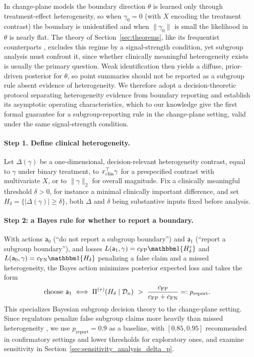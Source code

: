 \documentclass[11pt]{article}
\theoremstyle{definition}
\theoremstyle{plain}
\begin{document}
In change-plane models the boundary direction $\theta$ is learned only through treatment-effect heterogeneity, so when $\gamma_0=0$ (with $X$ encoding the treatment contrast) the boundary is unidentified and when $\|\gamma_0\|$ is small the likelihood in $\theta$ is nearly flat. The theory of Section~\ref{sec:theorems}, like its frequentist counterparts \citep[e.g.,][]{Fan2017,Kang2025}, excludes this regime by a signal-strength condition, yet subgroup analysis must confront it, since whether clinically meaningful heterogeneity exists is usually the primary question. Weak identification then yields a diffuse, prior-driven posterior for $\theta$, so point summaries should not be reported as a subgroup rule absent evidence of heterogeneity. We therefore adopt a decision-theoretic protocol separating heterogeneity evidence from boundary reporting and establish its asymptotic operating characteristics, which to our knowledge give the first formal guarantee for a subgroup-reporting rule in the change-plane setting, valid under the same signal-strength condition.

\paragraph{Step 1. Define clinical heterogeneity.}
Let $\Delta(\gamma)$ be a one-dimensional, decision-relevant heterogeneity contrast, equal to $\gamma$ under binary treatment, to $x_{\rm clin}^\top\gamma$ for a prespecified contrast with multivariate $X$, or to $\|\gamma\|_2$ for overall magnitude. Fix a clinically meaningful threshold $\delta>0$, for instance a minimal clinically important difference, and set $H_\delta=\{|\Delta(\gamma)|\ge\delta\}$, both $\Delta$ and $\delta$ being substantive inputs fixed before analysis.

\paragraph{Step 2: a Bayes rule for whether to report a boundary.}
With actions $\mathsf{a}_0$ (``do not report a subgroup boundary'') and $\mathsf{a}_1$ (``report a subgroup boundary''), and losses $L(\mathsf{a}_1,\gamma)=c_{\rm FP}\mathbbm 1\{H_\delta^c\}$ and $L(\mathsf{a}_0,\gamma)=c_{\rm FN}\mathbbm 1\{H_\delta\}$ penalizing a false claim and a missed heterogeneity, the Bayes action minimizes posterior expected loss and takes the form
\begin{equation}
    \text{choose }\mathsf{a}_1 \iff
\Pi^{(\tau)}(H_\delta\mid \mathcal D_n)\ >\ \frac{c_{\rm FP}}{c_{\rm FP}+c_{\rm FN}}=:p_{\mathrm{report}}.
\label{eq:bayes_action}
\end{equation}
This specializes Bayesian subgroup decision theory \citep{Sivaganesan2011,BergerWangShen2014} to the change-plane setting. Since regulators penalize false subgroup claims more heavily than missed heterogeneity \citep{ema2019subgroup,Dane2019}, we use $p_{\mathrm{report}}=0.9$ as a baseline, with $[0.85,0.95]$ recommended in confirmatory settings and lower thresholds for exploratory ones, and examine sensitivity in Section~\ref{sec:sensitivity_analysis_delta_p}.
\end{document}
